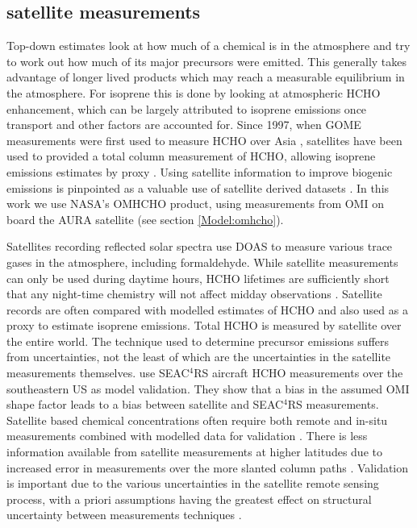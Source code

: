   
  \subsection{satellite measurements}
    \label{BioIsop:intro:satellite_inversion}
    Top-down estimates look at how much of a chemical is in the atmosphere and try to work out how much of its major precursors were emitted.
    This generally takes advantage of longer lived products which may reach a measurable equilibrium in the atmosphere.
    For isoprene this is done by looking at atmospheric HCHO enhancement, which can be largely attributed to isoprene emissions once transport and other factors are accounted for.
    Since 1997, when GOME measurements were first used to measure HCHO over Asia \parencite{Thomas1998}, satellites have been used to provided a total column measurement of HCHO, allowing isoprene emissions estimates by proxy \parencite{Palmer2001,Bauwens2016}.
    Using satellite information to improve biogenic emissions is pinpointed as a valuable use of satellite derived datasets \parencite{Streets2013}.
    In this work we use NASA's OMHCHO product, using measurements from OMI on board the AURA satellite (see section \ref{Model:omhcho}).
    
    
    Satellites recording reflected solar spectra use DOAS to measure various trace gases in the atmosphere, including formaldehyde. 
    While satellite measurements can only be used during daytime hours, HCHO lifetimes are sufficiently short that any night-time chemistry will not affect midday observations \parencite{Wolfe2016}.
    Satellite records are often compared with modelled estimates of HCHO and also used as a proxy to estimate isoprene emissions.
    Total HCHO is measured by satellite over the entire world.
    The technique used to determine precursor emissions suffers from uncertainties, not the least of which are the uncertainties in the satellite measurements themselves.
    \textcite{Zhu2016} use SEAC$^4$RS aircraft HCHO measurements over the southeastern US as model validation. 
    They show that a bias in the assumed OMI shape factor leads to a bias between satellite and SEAC$^4$RS measurements.
    Satellite based chemical concentrations often require both remote and in-situ measurements combined with modelled data for validation \parencite{Marais2014}.
    There is less information available from satellite measurements at higher latitudes due to increased error in measurements over the more slanted column paths \parencite{DeSmedt2015}.
    Validation is important due to the various uncertainties in the satellite remote sensing process, with a priori assumptions having the greatest effect on structural uncertainty between measurements techniques \textcite{Lorente2017}.
    
